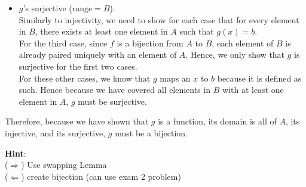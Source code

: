 {\begin{itemize}
                    \noindent If $x = a_1$ and $y \ne a_2$ (or $x = a_2$ and $y \ne a_1$) the outputs from $g(x)$ and $g(y)$ would differ. That is, if $x = a_1$, then $g(x) = b_2$, and if $y \ne a_2$, $g(y) = f(y)$ which would have the same mapping (see paragraph 2). Since $b_2 = f(a_2)$ and $f$ is injective, $f(y) \ne b_2$ unless $y = a_2$, which is not the case. \\

                    \noindent Therefore, the only possibility for $g(x) = g(y)$ is when $x = y$, thus confirming that $g$ is injective for all elements in $A$. \\
                    
                    \item $g$'s surjective ($\text{range} = B$). \\
                    Similarly to injectivity, we need to show for each case that for every element in $B$, there exists at least one element in $A$ such that $g(x) = b$. \\ 
                    
                    For the third case, since $f$ is a bijection from $A$ to $B$, each element of $B$ is already paired uniquely with an element of $A$. Hence, we only show that $g$ is surjective for the first two cases. \\

                    For these other cases, we know that $g$ maps an $x$ to $b$ because it is defined as such. Hence because we have covered all elements in $B$ with at least one element in $A$, $g$ must be surjective.
                \end{itemize} 
                Therefore, because we have shown that $g$ is a function, its domain is all of $A$, its injective, and its surjective, $g$ must be a bijection.
            }


            \textbf{Hint}:\\
            ($\Rightarrow$) Use swapping Lemma \\
            ($\Leftarrow$) create bijection (can use exam 2 problem)
    
